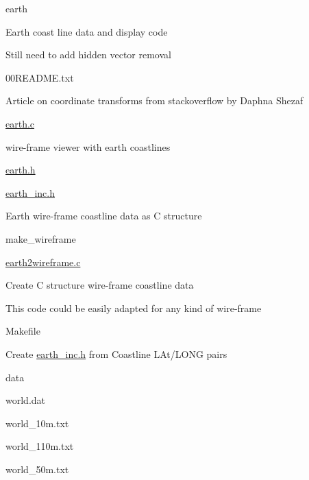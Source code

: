 \begin{DoxyItemize}
\item earth
\begin{DoxyItemize}
\item Earth coast line data and display code
\item Still need to add hidden vector removal
\begin{DoxyItemize}
\item 00\-R\-E\-A\-D\-M\-E.\-txt
\begin{DoxyItemize}
\item Article on coordinate transforms from stackoverflow by Daphna Shezaf
\end{DoxyItemize}
\item \hyperlink{earth_8c}{earth.\-c}
\begin{DoxyItemize}
\item wire-\/frame viewer with earth coastlines
\end{DoxyItemize}
\item \hyperlink{earth_8h}{earth.\-h}
\item \hyperlink{earth__inc_8h}{earth\-\_\-inc.\-h}
\begin{DoxyItemize}
\item Earth wire-\/frame coastline data as C structure
\end{DoxyItemize}
\item make\-\_\-wireframe
\begin{DoxyItemize}
\item \hyperlink{earth2wireframe_8c}{earth2wireframe.\-c}
\begin{DoxyItemize}
\item Create C structure wire-\/frame coastline data
\item This code could be easily adapted for any kind of wire-\/frame
\end{DoxyItemize}
\item Makefile
\begin{DoxyItemize}
\item Create \hyperlink{earth__inc_8h}{earth\-\_\-inc.\-h} from Coastline L\-At/\-L\-O\-N\-G pairs
\end{DoxyItemize}
\item data
\begin{DoxyItemize}
\item world.\-dat
\item world\-\_\-10m.\-txt
\item world\-\_\-110m.\-txt
\item world\-\_\-50m.\-txt

\end{DoxyItemize}
\end{DoxyItemize}
\end{DoxyItemize}
\end{DoxyItemize}
\end{DoxyItemize}
